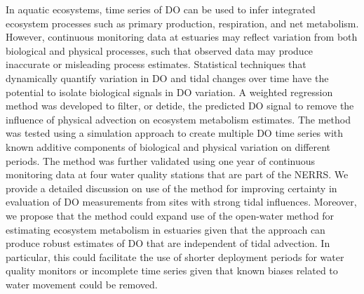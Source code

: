 In aquatic ecosystems, time series of \ac{DO} can be used to infer integrated ecosystem processes such as primary production, respiration, and net metabolism.  However, continuous monitoring data at estuaries may reflect variation from both biological and physical processes, such that observed data may produce inaccurate or misleading process estimates.  Statistical techniques that dynamically quantify variation in \ac{DO} and tidal changes over time have the potential to isolate biological signals in \ac{DO} variation.  A weighted regression method was developed to filter, or detide, the predicted \ac{DO} signal to remove the influence of physical advection on ecosystem metabolism estimates.  The method was tested using a simulation approach to create multiple \ac{DO} time series with known additive components of biological and physical variation on different periods.  The method was further validated using one year of continuous monitoring data at four water quality stations that are part of the \acl{NERRS}. We provide a detailed discussion on use of the method for improving certainty in evaluation of \ac{DO} measurements from sites with strong tidal influences.  Moreover, we propose that the method could expand use of the open-water method for estimating ecosystem metabolism in estuaries given that the approach can produce robust estimates of \ac{DO} that are independent of tidal advection.  In particular, this could facilitate the use of shorter deployment periods for water quality monitors or incomplete time series given that known biases related to water movement could be removed. 